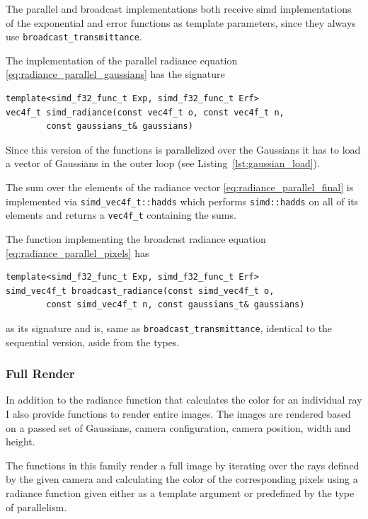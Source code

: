 \documentclass[a4paper, 11pt]{memoir}
\begin{document}
    The parallel and broadcast implementations both receive \gls{simd} implementations of the exponential and error
    functions as template parameters, since they always use \texttt{broadcast_transmittance}.

    The implementation of the parallel \gls{radiance} equation \eqref{eq:radiance_parallel_gaussians} has the signature
    \begin{verbatim}
template<simd_f32_func_t Exp, simd_f32_func_t Erf>
vec4f_t simd_radiance(const vec4f_t o, const vec4f_t n,
        const gaussians_t& gaussians)
    \end{verbatim}
    
    Since this version of the functions is parallelized over the Gaussians it has to load a vector of Gaussians in the
    outer loop (see Listing~\ref{lst:gaussian_load}).

    The sum over the elements of the \gls{radiance} vector \eqref{eq:radiance_parallel_final} is implemented via
    \texttt{simd_vec4f_t::hadds} which performs \texttt{simd::hadds} on all of its elements and returns
    a \texttt{vec4f_t} containing the sums.

    The function implementing the broadcast \gls{radiance} equation \eqref{eq:radiance_parallel_pixels} has
    \begin{verbatim}
template<simd_f32_func_t Exp, simd_f32_func_t Erf>
simd_vec4f_t broadcast_radiance(const simd_vec4f_t o,
        const simd_vec4f_t n, const gaussians_t& gaussians)
    \end{verbatim}
    as its signature and is, same as \texttt{broadcast_transmittance}, identical to the sequential version,
    aside from the types.
    
    \subsubsection{Full Render}
    In addition to the radiance function that calculates the color for an individual ray I also provide functions to
    render entire images. The images are rendered based on a passed set of Gaussians, camera configuration, camera position,
    width and height.

    The functions in this family render a full image by iterating over the rays defined by the given camera and calculating
    the color of the corresponding pixels using a \gls{radiance} function given either as a template argument or predefined by
    the type of parallelism.
\end{document}
